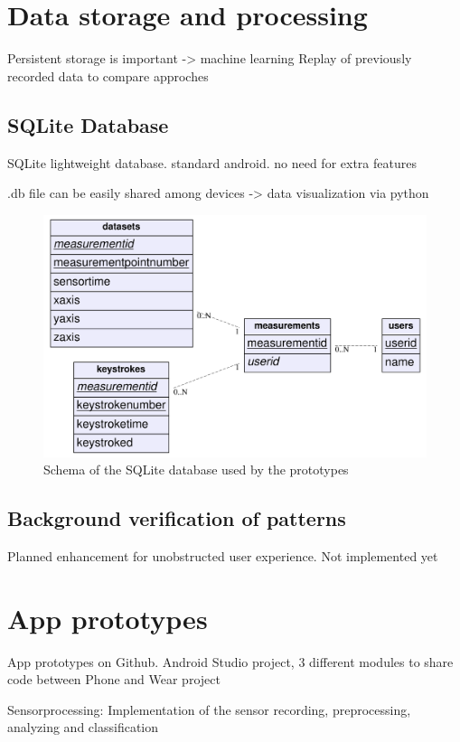 \section{Data storage and processing}
Persistent storage is important -> machine learning
Replay of previously recorded data to compare approches

\subsection{SQLite Database}
SQLite lightweight database. standard android. no need for extra features

.db file can be easily shared among devices -> data visualization via python
\begin{figure}
    \centering
    \includegraphics[width=\textwidth]{figures/databaseschema.png}
    \caption{Schema of the SQLite database used by the prototypes}
    \label{fig:dbschema}
\end{figure}

\subsection{Background verification of patterns}
Planned enhancement for unobstructed user experience. Not implemented yet

\section{App prototypes}
App prototypes on Github. Android Studio project, 3 different modules to share code between Phone and Wear project

Sensorprocessing: Implementation of the sensor recording, preprocessing, analyzing and classification

